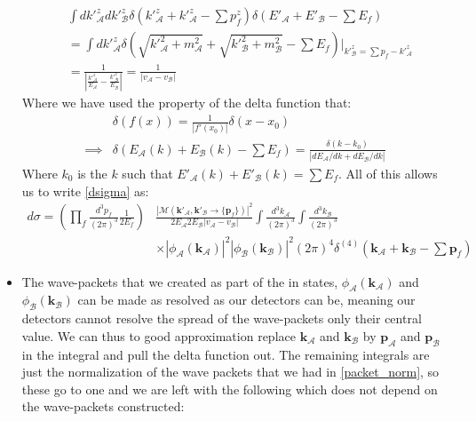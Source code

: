 \documentclass[11pt]{article}
\numberwithin{equation}{section}
\begin{document}
\begin{itemize}
  \begin{align*}
     &\int dk'^z_{\mathcal{A}}dk'^z_{\mathcal{B}}\delta\left(k'^z_{\mathcal{A}}+k'^z_{\mathcal{A}}-\sum p^z_f\right)\delta(E'_{\mathcal{A}}+E'_{\mathcal{B}}-\sum E_{f}) \\
     & = \int dk'^z_{\mathcal{A}}\delta(\sqrt{k'^2_{\mathcal{A}}+m_{\mathcal{A}}^2}+\sqrt{k'^2_{\mathcal{B}}+m_{\mathcal{B}}^2}-\sum E_{f}) \bigg\vert_{k'^z_{\mathcal{B}} = \sum p_f - k'^z_{\mathcal{A}}}  \\
     & = \frac{1}{|\frac{k'^z_{\mathcal{A}}}{E_{\mathcal{A}}}-\frac{k'^z_{\mathcal{B}}}{E_{\mathcal{B}}}|} = \frac{1}{|v_{\mathcal{A}}-v_{\mathcal{B}}|}
   \end{align*} 
   Where we have used the property of the delta function that:
   \begin{align*}
         &\delta(f(x)) = \frac{1}{|f'(x_0)|}\delta(x-x_0) \\
         \implies  & \delta(E_{\mathcal{A}}(k)+E_{\mathcal{B}}(k) - \sum E_{f}) = \frac{\delta(k-k_0)}{|dE_{\mathcal{A}}/dk+dE_{\mathcal{B}}/dk|}
     \end{align*}
     Where $k_0$ is the $k$ such that $E'_{\mathcal{A}}(k)+E'_{\mathcal{B}}(k)= \sum E_{f}$. All of this allows us to write \ref{dsigma} as:
     \begin{align*}
       d\sigma = \left(\prod_f \frac{d^3p_f}{(2\pi)^3}\frac{1}{2E_f}\right)&\frac{|\mathcal{M}(\textbf{k}'_{\mathcal{A}},\textbf{k}'_{\mathcal{B}} \rightarrow \{\textbf{p}_f\})|^2}{2E_{\mathcal{A}}2E_{\mathcal{B}}|v_{\mathcal{A}}-v_{\mathcal{B}}|}\int\frac{d^3k_{\mathcal{A}}}{(2\pi)^3}\int \frac{d^3k_{\mathcal{B}}}{(2\pi)^3} \\
       &\times |\phi_{\mathcal{A}}(\textbf{k}_{\mathcal{A}})|^2|\phi_{\mathcal{B}}(\textbf{k}_{\mathcal{B}})|^2(2\pi)^4\delta^{(4)}\left(\textbf{k}_{\mathcal{A}}+\textbf{k}_{\mathcal{B}} - \sum \textbf{p}_f\right)
     \end{align*}
     \item The wave-packets that we created as part of the in states, $\phi_{\mathcal{A}}(\textbf{k}_{\mathcal{A}})$ and $\phi_{\mathcal{B}}(\textbf{k}_{\mathcal{B}})$ can be made as resolved as our detectors can be, meaning our detectors cannot resolve the spread of the wave-packets only their central value. We can thus to good approximation replace $\textbf{k}_{\mathcal{A}}$ and $\textbf{k}_{\mathcal{B}}$ by $\textbf{p}_{\mathcal{A}}$ and $\textbf{p}_{\mathcal{B}}$ in the integral and pull the delta function out. The remaining integrals are just the normalization of the wave packets that we had in \ref{packet_norm}, so these go to one and we are left with the following which does not depend on the wave-packets constructed:

\end{itemize}
\end{document}
